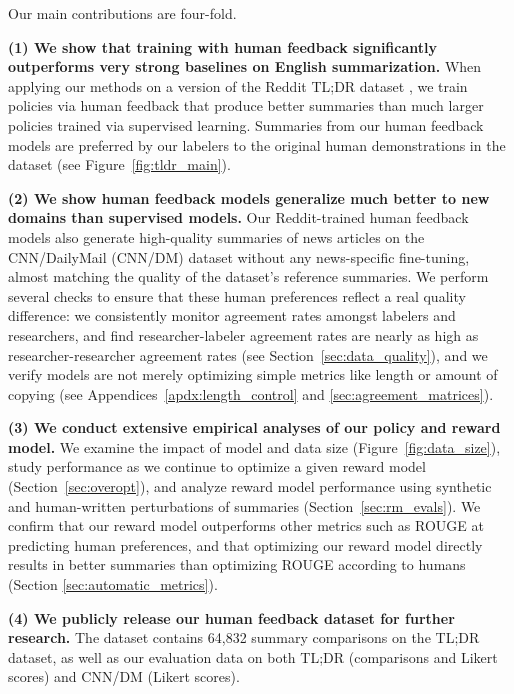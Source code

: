 Our main contributions are four-fold.

\textbf{(1) We show that training with human feedback significantly outperforms very strong baselines on English summarization.} When applying our methods on a version of the Reddit TL;DR dataset \cite{volske2017tl}, we train policies via human feedback that produce better summaries than much larger policies trained via supervised learning. Summaries from our human feedback models are preferred by our labelers to the original human demonstrations in the dataset (see Figure~\ref{fig:tldr_main}). 

\textbf{(2) We show human feedback models generalize much better to new domains than supervised models.} Our Reddit-trained human feedback models also generate high-quality summaries of news articles on the CNN/DailyMail (CNN/DM) dataset without any news-specific fine-tuning, almost matching the quality of the dataset’s reference summaries. We perform several checks to ensure that these human preferences reflect a real quality difference: we consistently monitor agreement rates amongst labelers and researchers, and find researcher-labeler agreement rates are nearly as high as researcher-researcher agreement rates (see Section~\ref{sec:data_quality}), and we verify models are not merely optimizing simple metrics like length or amount of copying (see Appendices~\ref{apdx:length_control} and \ref{sec:agreement_matrices}). 

\textbf{(3) We conduct extensive empirical analyses of our policy and reward model.} We examine the impact of model and data size (Figure~\ref{fig:data_size}), study performance as we continue to optimize a given reward model (Section~\ref{sec:overopt}), and analyze reward model performance using synthetic and human-written perturbations of summaries (Section~\ref{sec:rm_evals}). We confirm that our reward model outperforms other metrics such as ROUGE at predicting human preferences, and that optimizing our reward model directly results in better summaries than optimizing ROUGE according to humans (Section \ref{sec:automatic_metrics}).

\textbf{(4) We publicly release our human feedback dataset for further research.} The dataset contains 64,832 summary comparisons on the TL;DR dataset, as well as our evaluation data on both TL;DR (comparisons and Likert scores) and CNN/DM (Likert scores). 

